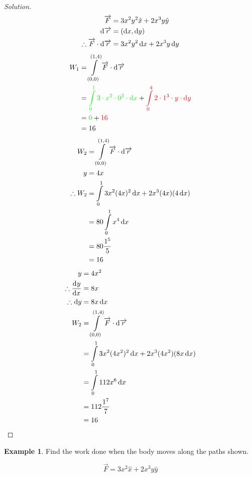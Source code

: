 \documentclass[fleqn]{article}
\theoremstyle{definition}
\newtheorem{example}{Example}
\theoremstyle{theorem}
\newenvironment{solution}
{\begin{proof}[Solution]\let\qed\relax}
	{\end{proof}}
\begin{document}
\begin{solution}
	\begin{align*}
		\overrightarrow{F} &= 3 x^2 y^2 \hat{x} + 2 x^3 y \hat{y}\\
		\dif \overrightarrow{r} &= (\dif x, \dif y) \\
		\therefore \overrightarrow{F} \cdot \dif \overrightarrow{r} &= 3 x^2 y^2 \dif x + 2 x^3 y \dif y
	\end{align*}
	\begin{align*}
		W_1 &= \int\displaylimits_{(0,0)}^{(1,4)} \overrightarrow{F} \cdot \dif \overrightarrow{r} \\
		&= {\color{green} \int\displaylimits_{0}^{1} 3 \cdot x^2 \cdot 0^2 \cdot \dif x} + {\color{red} \int\displaylimits_{0}^{4} 2 \cdot 1^3 \cdot y \cdot \dif y} \\
		&= {\color{green} 0} + {\color{red} 16} \\
		&= 16
	\end{align*}
	{
		\color{blue}
		\begin{align*}
			W_2 &= \int\displaylimits_{(0,0)}^{(1,4)}  \overrightarrow{F} \cdot \dif \overrightarrow{r} \\
			y &= 4x \\
			\therefore W_2 &= \int\displaylimits_{0}^{1} 3x^2(4x)^2 \dif x + 2 x^3 (4x) (4 \dif x) \\
			&= 80 \int\displaylimits_{0}^{1} x^4 \dif x \\
			&= 80 \dfrac{1^5}{5} \\
			&= 16
		\end{align*}
	}
	{
		\color{orange}
		\begin{align*}
			y &= 4x^2 \\
			\therefore \dod{y}{x} &= 8x \\
			\therefore \dif y &= 8 x \dif x \\
			W_2 &= \int\displaylimits_{(0,0)}^{(1,4)}  \overrightarrow{F} \cdot \dif \overrightarrow{r} \\
			&= \int\displaylimits_{0}^{1} 3 x^2 (4 x^2)^2 \dif x + 2 x^3 (4x^2) (8 x \dif x) \\
			&= \int\displaylimits_{0}^{1} 112 x^6 \dif x \\
			&= 112 \dfrac{1^7}{7} \\
			&= 16
		\end{align*}
	}
\end{solution}

\begin{example}
	Find the work done when the body moves along the paths shown.
	\begin{equation*}
		\overrightarrow{F} = 3 x^2 \hat{x} + 2 x^3 y \hat{y}
	\end{equation*}
\end{example}
\end{document}
